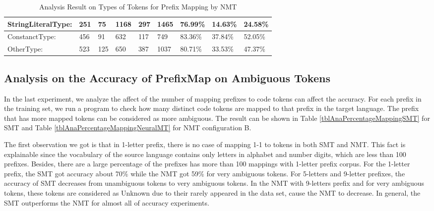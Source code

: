 \begin{table*}[]
\begin{tabular}{|l|l|l|l|l|l|l|l|l|}
StringLiteralType:      & 251              & 75                 & 1168         & 297          & 1465         & 76.99\%            & 14.63\%         & 24.58\%     \\ \hline
ConstanctType:          & 456              & 91                 & 632          & 117          & 749          & 83.36\%            & 37.84\%         & 52.05\%     \\ \hline
OtherType:              & 523              & 125                & 650          & 387          & 1037         & 80.71\%            & 33.53\%         & 47.37\%     \\ \hline
\end{tabular}
\caption{Analysis Result on Types of Tokens for Prefix Mapping by NMT}
\label{tblAnaTypeTokensNeuralMT}
\end{table*}

\subsection{Analysis on the Accuracy of PrefixMap on Ambiguous Tokens}
In the last experiment, we analyze the affect of the number of mapping prefixes to code tokens can affect the accuracy. For each prefix in the training set, we run a program to check how many distinct code tokens are mapped to that prefix in the target language. The prefix that has more mapped tokens can be considered as more ambiguous. The result can be shown in Table \ref{tblAnaPercentageMappingSMT} for SMT and Table \ref{tblAnaPercentageMappingNeuralMT} for NMT configuration B.

The first observation we got is that in 1-letter prefix, there is no case of mapping 1-1 to tokens in both SMT and NMT. This fact is explainable since the vocabulary of the source language contains only letters in alphabet and number digits, which are less than 100 prefixes. Besides, there are a large percentage of the prefixes has more than 100 mappings with 1-letter prefix corpus. For the 1-letter prefix, the SMT got accuracy about 70\% while the NMT got 59\% for very ambiguous tokens. For 5-letters and 9-letter prefixes, the accuracy of SMT decreases from unambiguous tokens to very ambiguous tokens. In the NMT with 9-letters prefix and for very ambiguous tokens, these tokens are considered as Unknown due to their rarely appeared in the data set, cause the NMT to decrease. In general, the SMT outperforms the NMT for almost all of accuracy experiments.


